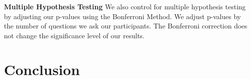 \documentclass[12pt]{article}
\begin{document}
\textbf{Multiple Hypothesis Testing}
We also control for multiple hypothesis testing by adjusting our p-values using the Bonferroni Method. We adjust p-values by the number of questions we ask our participants. The Bonferroni correction does not change the significance level of our results. 

\section{Conclusion} 
\clearpage
\end{document}
